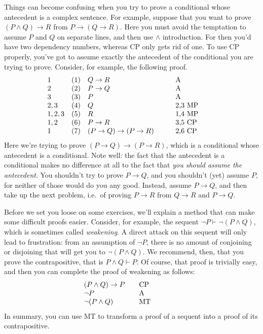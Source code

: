 Things can become confusing when you try to prove a conditional whose
antecedent is a complex sentence.  For example, suppose that you want
to prove $(P\wedge Q)\to R$ from $P\to (Q\to R)$.  Here you must avoid
the temptation to assume $P$ and $Q$ on separate lines, and then use
$\wedge$ introduction.  For then you'd have two dependency numbers,
whereas CP only gets rid of one.  To use CP properly, you've got to
assume exactly the antecedent of the conditional you are trying to
prove.  Consider, for example, the following proof.
\[ \begin{array}{l l >{$}p{4cm}<{$} p{2cm} l}
     1 & (1) & Q\to R & A \\
     2 & (2) & P\to Q & A \\
     3 & (3) & P      & A \\
     2,3 & (4) & Q    & 2,3 MP \\
     1,2,3 & (5) & R  & 1,4 MP \\
     1,2   & (6) & P\to R & 3,5 CP \\
     1 & (7) & (P\to Q)\to (P\to R) & 2,6 CP \end{array} \] Here we're
 trying to prove $(P\to Q)\to (P\to R)$, which is a conditional whose
 antecedent is a conditional.  Note well: the fact that the antecedent
 is a conditional makes no difference at all to the fact that
 \textit{you should assume the antecedent}.  You shouldn't try to
 prove $P\to Q$, and you shouldn't (yet) assume $P$, for neither of
 those would do you any good.  Instead, assume $P\to Q$, and then take
 up the next problem, i.e.\ of proving $P\to R$ from $Q\to R$ and
 $P\to Q$.

 Before we set you loose on some exercises, we'll explain a method that
 can make some difficult proofs easier.  Consider, for example, the
 sequent $\neg P\vdash \neg (P\wedge Q)$, which is sometimes called
 \textit{weakening}.  A direct attack on this sequent will only lead
 to frustration: from an assumption of $\neg P$, there is no amount of
 conjoining or disjoining that will get you to $\neg (P\wedge Q)$.  We
 recommend, then, that you prove the contrapositive, that is
 $P\wedge Q\vdash P$.  Of course, that proof is trivially easy, and
 then you can complete the proof of weakening as follows:
 \[ \begin{array}{llp{2cm}ll}
      (P\wedge Q)\to P & & CP \\
      \neg P & &  A  \\
      \neg (P\wedge Q) & & MT \end{array} \] In summary, you can use
 MT to transform a proof of a sequent into a proof of its contrapositive.

